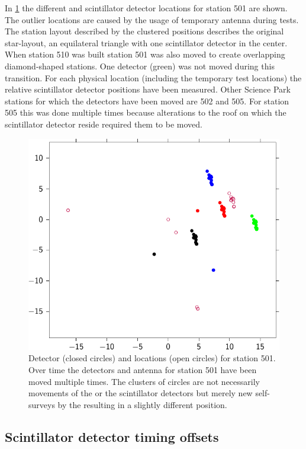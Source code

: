 In \cref{fig:locations_501} the different \gps and scintillator detector locations for station 501 are shown. The outlier \gps locations are caused by the usage of temporary \gps antenna during tests. The station layout described by the clustered positions describes the original star-layout, an equilateral triangle with one scintillator detector in the center. When station 510 was built station 501 was also moved to create overlapping diamond-shaped stations. One detector (green) was not moved during this transition. For each physical \gps location (including the temporary test locations) the relative scintillator detector positions have been measured. Other Science Park stations for which the detectors have been moved are 502 and 505. For station 505 this was done multiple times because alterations to the roof on which the scintillator detector reside required them to be moved.

\begin{figure}
    \centering
    \includegraphics{plots/station/locations_501}
    \caption{Detector (closed circles) and \gps locations (open circles) for station 501. Over time the detectors and \gps antenna for station 501 have been moved multiple times. The clusters of circles are not necessarily movements of the \gps or the scintillator detectors but merely new self-surveys by the \gps resulting in a slightly different position.}
    \label{fig:locations_501}
\end{figure}


\subsection{Scintillator detector timing offsets}

